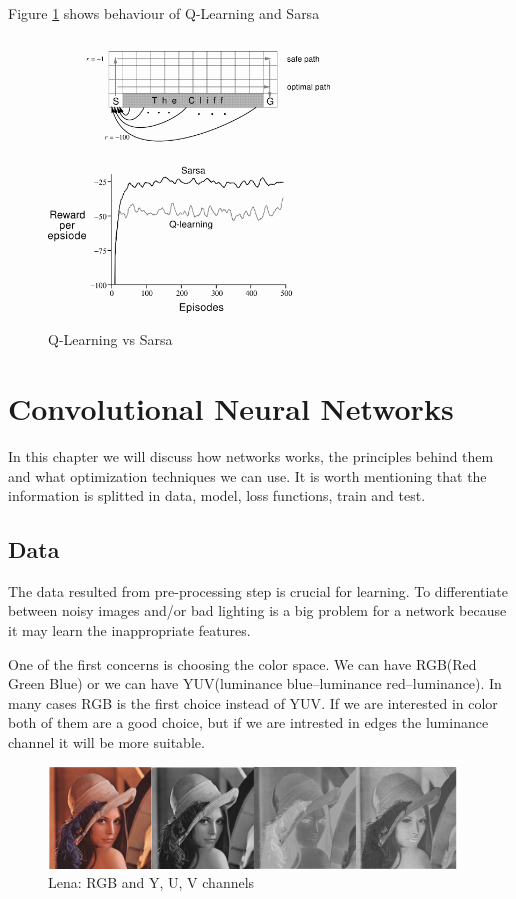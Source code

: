 Figure \ref{fig:svsq} shows behaviour of Q-Learning and Sarsa 

\begin{figure}[h]
	\begin{center}
		\includegraphics[width=282px,height=288px]{src/img/state/qsrewards}
		\caption{Q-Learning vs Sarsa\cite{sutton}} \label{fig:svsq}
    \end{center}
\end{figure}


\section{Convolutional Neural Networks}

In this chapter we will discuss how networks works, the principles behind them and what optimization techniques we can use. It is worth mentioning that the information is splitted in data, model, loss functions, train and test.

\subsection{Data}
\label{data}
The data resulted from pre-processing step is crucial for learning. To differentiate between noisy images and/or bad lighting is a big problem for a network because it may learn the inappropriate features.

One of the first concerns is choosing the color space. We can have RGB(Red Green Blue) or we can have YUV(luminance blue–luminance red–luminance). In many cases RGB is the first choice instead of YUV\cite{pipeline}. If we are interested in color both of them are a good choice, but if we are intrested in edges the luminance channel it will be more suitable.

\begin{figure}[h]
	\begin{center}
		\includegraphics[width=410px,height=102px]{src/img/state/lenayuv}
		\caption{Lena: RGB and Y, U, V channels} \label{fig:lenayuv}
    \end{center}
\end{figure}

